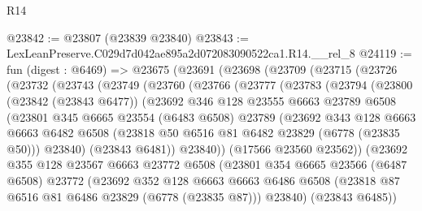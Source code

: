 \begin{lexlean}{R14}
\begin{coremodule}
@23842 := @23807 (@23839 @23840)
@23843 := LexLeanPreserve.C029d7d042ae895a2d072083090522ca1.R14.__rel_8
@24119 := fun (digest : @6469) =>
  @23675
    (@23691
      (@23698
        (@23709
          (@23715
            (@23726
              (@23732
                (@23743
                  (@23749
                    (@23760
                      (@23766
                        (@23777
                          (@23783
                            (@23794
                              (@23800
                                (@23842 (@23843 @6477))
                                (@23692
                                  @346
                                  @128
                                  @23555
                                  @6663
                                  @23789
                                  @6508
                                  (@23801
                                    @345
                                    @6665
                                    @23554
                                    (@6483 @6508)
                                    @23789
                                    (@23692
                                      @343
                                      @128
                                      @6663
                                      @6663
                                      @6482
                                      @6508
                                      (@23818 @50 @6516 @81 @6482 @23829 (@6778 (@23835 @50)))
                                      @23840)
                                    (@23843 @6481))
                                  @23840))
                              (@17566 @23560 @23562))
                            (@23692
                              @355
                              @128
                              @23567
                              @6663
                              @23772
                              @6508
                              (@23801
                                @354
                                @6665
                                @23566
                                (@6487 @6508)
                                @23772
                                (@23692
                                  @352
                                  @128
                                  @6663
                                  @6663
                                  @6486
                                  @6508
                                  (@23818 @87 @6516 @81 @6486 @23829 (@6778 (@23835 @87)))
                                  @23840)
                                (@23843 @6485))

\end{coremodule}
\end{lexlean}
